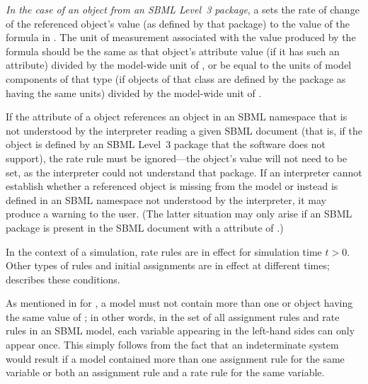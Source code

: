 \begin{itemize}
\begin{blockChanged}
\item \emph{In the case of an object from an SBML Level~3 package}, a \RateRule sets the rate of change of the referenced object's value (as defined by that package) to the value of the formula in .    The unit of measurement associated with the value produced by
  the formula should be the same as that object's 
  attribute value (if it has such an attribute) divided by the model-wide unit
  of , or be equal to
  the units of model components of that type (if objects of that class
  are defined by the package as having the same units) divided by the model-wide unit
  of .
\end{blockChanged}

\end{itemize}

\begin{blockChanged}

If the  attribute of a \RateRule object references an object in an SBML namespace that is not understood by the interpreter reading a given SBML document (that is, if the object is defined by an SBML Level~3 package that the software does not support), the rate rule must be ignored---the object's value will not need to be set, as the interpreter could not understand that package.  If an interpreter cannot establish whether a referenced object is missing from the model or instead is defined in an SBML namespace not understood by the interpreter, it may produce a warning to the user.  (The latter situation may only arise if an SBML package is present in the SBML document with a  attribute of .)

\end{blockChanged}

In the context of a simulation, rate rules are in effect for
simulation time $t > 0$.  Other types of rules and initial
assignments are in effect at different times;
 describes these conditions.

As mentioned in  for
\AssignmentRule, a model must not contain more than one \RateRule
or \AssignmentRule object having the same value of
; in other words, in the set of all assignment
rules and rate rules in an SBML model, each variable appearing in
the left-hand sides can only appear once.  This simply follows
from the fact that an indeterminate system would result if a model
contained more than one assignment rule for the same variable or
both an assignment rule and a rate rule for the same variable.


